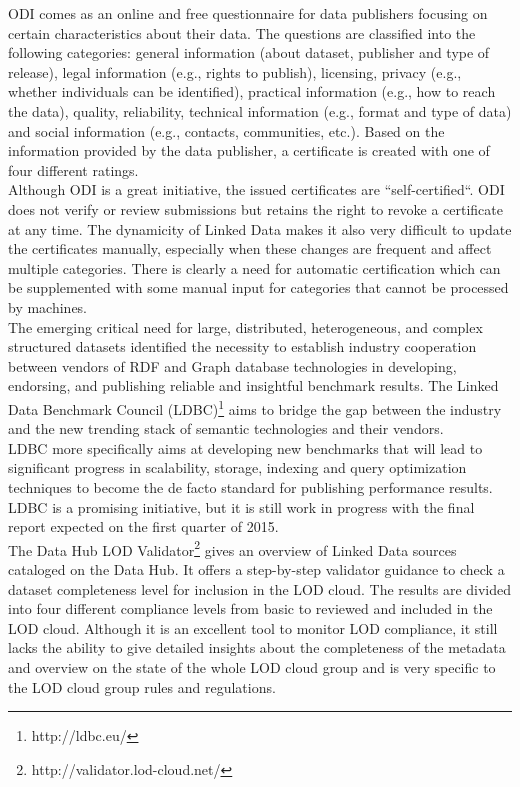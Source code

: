 \documentclass[onecolumn, crcready]{iosart2c}
\begin{document}
ODI comes as an online and free questionnaire for data publishers focusing on certain characteristics about their data. The questions are classified into the following categories: general information (about dataset, publisher and type of release), legal information (e.g., rights to publish), licensing, privacy (e.g., whether individuals can be identified), practical information (e.g., how to reach the data), quality, reliability, technical information (e.g., format and type of data) and social information (e.g., contacts, communities, etc.). Based on the information provided  by the data  publisher,  a certificate  is created  with one of four different ratings.\\
Although ODI is a great initiative, the issued certificates are “self-certified“. ODI does not verify or review submissions but retains the right to revoke a certificate at any time. The dynamicity of Linked Data  makes it also very difficult to update the certificates manually, especially when these changes are frequent and affect multiple categories. There is clearly a need for automatic certification which can be supplemented with some manual input for categories that cannot be processed by machines.\\

The emerging critical need for large, distributed, heterogeneous, and complex structured datasets identified the necessity to establish industry cooperation between vendors of RDF and Graph database technologies in developing, endorsing, and publishing reliable and insightful benchmark results. The Linked Data Benchmark Council (LDBC)\footnote{http://ldbc.eu/} aims to bridge the gap between the industry and the new trending stack of semantic technologies and their vendors. \\ LDBC more specifically aims at developing new benchmarks that will lead to significant progress in scalability, storage, indexing and query optimization techniques to become the de facto standard for publishing performance results. LDBC is a promising initiative, but it is still work in progress with the final report expected on the first quarter of 2015.\\

The Data Hub LOD Validator\footnote{http://validator.lod-cloud.net/} gives an overview of Linked Data sources cataloged on the Data Hub. It offers a step-by-step validator guidance to check a dataset completeness level for inclusion in the LOD cloud. The results are divided into four different compliance levels from basic to reviewed and included in the LOD cloud. Although it is an excellent tool to monitor LOD compliance, it still lacks the ability to give detailed insights about the completeness of the metadata and overview on the state of the whole LOD cloud group and is very specific to the LOD cloud group rules and regulations.\\
\end{document}
